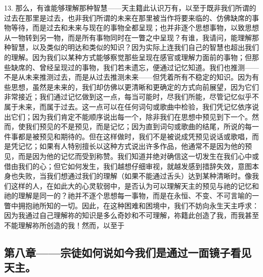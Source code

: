 13. 那么，有谁能够理解那种智慧——天主籍此认识万有，以至于既非我们所谓的过去在那里是过去，也非我们所谓的未来在那里被当作将要来临的、仿佛缺席的事物等待，而是过去和未来与现在的事物全都呈现；也并非逐个思想事物，以致思想从一物转到另一物，而是所有事物同时在一瞥之中呈现？有谁，我请问，能理解那种智慧，以及类似的明达和类似的知识？因为实际上连我们自己的智慧也超出我们的理解。因为我们以某种方式能够察觉那些呈现在感官或理解力面前的事物；但那些缺席的、曾经呈现过的事物，我们若未遗忘，便通过记忆知道。我们也推测——不是从未来推测过去，而是从过去推测未来——但凭着所有不稳定的知识。因为有些思想，虽然是未来的，我们却仿佛以更清晰和更确定的方式向前展望，因为它们非常接近；我们通过记忆做到这一点，每当可能时，尽我们所能，尽管记忆似乎不属于未来，而属于过去。这一点可以在任何词句或歌曲中检验，我们凭记忆依序说出它们；因为我们肯定不能顺序说出每一个，除非我们在思想中预见到下一个。然而，使我们预见的不是预见，而是记忆；因为直到词句或歌曲的结尾，所说的每一件事都是被预见和期待的。但在这样做时，我们不是被说成凭预见说话或歌唱，而是凭记忆；如果有人特别擅长以这种方式说出许多作品，他通常不是因为他的预见，而是因为他的记忆而受到称赞。我们知道并绝对确信这一切发生在我们心中或借由我们的心；但它如何发生，我们越想仔细审视，就越发感到措辞失效，意图本身也失败，当我们想通过我们的理解（如果不能通过舌头）达到某种清晰时。像我们这样的人，在如此大的心灵软弱中，是否认为可以理解天主的预见与祂的记忆和祂的理解是同一的？祂并不逐个思想每一事物，而是在永恒、不变、不可言喻的一瞥中拥抱祂所知的一切。因此，在这种困难和困境中，我们不妨向永生天主呼求：因为我通过自己理解祢的知识是多么奇妙和不可理解，祢籍此创造了我，而我甚至不能理解祢所创造的我！然而，以至于\par


\subsection{第八章——宗徒如何说如今我们是通过一面镜子看见天主。}

